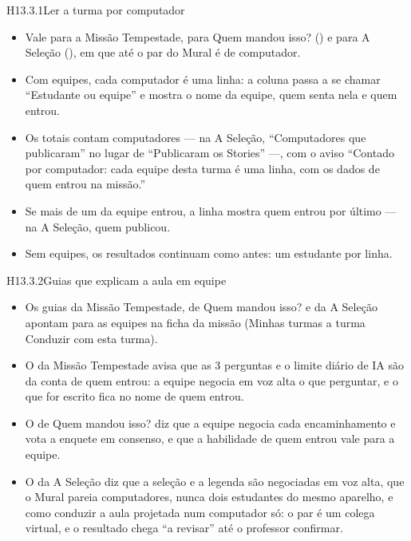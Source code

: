 
\begin{historia}{H13.3.1}{Ler a turma por computador}{\pronto}
\aceite
\begin{itemize}
  \item Vale para a Missão Tempestade, para Quem mandou isso? () e
    para A Seleção (), em que até o par do Mural é de computador.
  \item Com equipes, cada computador é uma linha: a coluna passa a se chamar
    \enquote{Estudante ou equipe} e mostra o nome da equipe, quem senta nela e
    quem entrou.
  \item Os totais contam computadores --- na A Seleção, \enquote{Computadores
    que publicaram} no lugar de \enquote{Publicaram os Stories} ---, com o aviso
    \enquote{Contado por computador: cada equipe desta turma é uma linha, com
    os dados de quem entrou na missão.}
  \item Se mais de um da equipe entrou, a linha mostra quem entrou por último
    --- na A Seleção, quem publicou.
  \item Sem equipes, os resultados continuam como antes: um estudante por
    linha.
\end{itemize}
\end{historia}

\begin{historia}{H13.3.2}{Guias que explicam a aula em equipe}{\pronto}
\aceite
\begin{itemize}
  \item Os guias da Missão Tempestade, de Quem mandou isso? e da A Seleção
    apontam para as equipes na ficha da missão (Minhas turmas \seta{} a turma
    \seta{} Conduzir com esta turma).
  \item O da Missão Tempestade avisa que as 3 perguntas e o limite diário de IA
    são da conta de quem entrou: a equipe negocia em voz alta o que perguntar,
    e o que for escrito fica no nome de quem entrou.
  \item O de Quem mandou isso? diz que a equipe negocia cada encaminhamento e
    vota a enquete em consenso, e que a habilidade de quem entrou vale para a
    equipe.
  \item O da A Seleção diz que a seleção e a legenda são negociadas em voz
    alta, que o Mural pareia computadores, nunca dois estudantes do mesmo
    aparelho, e como conduzir a aula projetada num computador só: o par é um
    colega virtual, e o resultado chega \enquote{a revisar} até o professor
    confirmar.
\end{itemize}
\end{historia}

